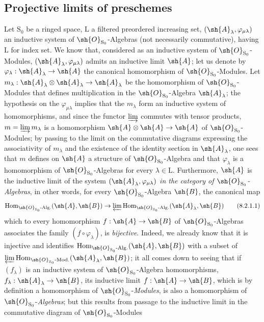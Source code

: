 \subsection{Projective limits of preschemes}
\label{subsection:IV.8.2}

\begin{env}[8.2.1]
\label{IV.8.2.1}
Let $\mathrm{S}_0$ be a ringed space, $\mathrm{L}$ a filtered preordered increasing set, $(\sh{A}_\lambda,\varphi_{\mu\lambda})$ an inductive system of $\sh{O}_{\mathrm{S}_0}$-Algebras (not necessarily commutative), having $\mathrm{L}$ for index set.
We know that, considered as an inductive system of $\sh{O}_{\mathrm{S}_0}$-Modules, $(\sh{A}_\lambda,\varphi_{\mu\lambda})$ admits an inductive limit $\sh{A}$; let us denote by $\varphi_\lambda:\sh{A}_\lambda\to\sh{A}$ the canonical homomorphism of $\sh{O}_{\mathrm{S}_0}$-Modules.
Let $m_\lambda:\sh{A}_\lambda\otimes\sh{A}_\lambda\to\sh{A}_\lambda$ be the homomorphism of $\sh{O}_{\mathrm{S}_0}$-Modules that defines multiplication in the $\sh{O}_{\mathrm{S}_0}$-Algebra $\sh{A}_\lambda$; the hypothesis on the $\varphi_{\mu\lambda}$ implies that the $m_\lambda$ form an inductive system of homomorphisms,
and since the functor $\varinjlim$ commutes with tensor products, $m=\varinjlim m_\lambda$ is a homomorphism $\sh{A}\otimes\sh{A}\to\sh{A}$ of $\sh{O}_{\mathrm{S}_0}$-Modules; by passing to the limit on the commutative diagrams expressing the associativity of $m_\lambda$ and the existence of the identity section in $\sh{A}_\lambda$, one sees that $m$ defines on $\sh{A}$ a structure of $\sh{O}_{\mathrm{S}_0}$-Algebra and that $\varphi_\lambda$ is a homomorphism of $\sh{O}_{\mathrm{S}_0}$-Algebras for every $\lambda\in\mathrm{L}$.
Furthermore, $\sh{A}$ is the inductive limit of the system $(\sh{A}_\lambda,\varphi_{\mu\lambda})$ \emph{in the category of $\sh{O}_{\mathrm{S}_0}$-Algebras}, in other words, for every $\sh{O}_{\mathrm{S}_0}$-Algebra $\sh{B}$, the canonical map
\begin{equation}
  \operatorname{Hom}_{\sh{O}_{\mathrm{S}_0}\text{-}\mathrm{Alg.}}(\sh{A},\sh{B})\to\varprojlim\operatorname{Hom}_{\sh{O}_{\mathrm{S}_0}\text{-}\mathrm{Alg.}}(\sh{A}_\lambda,\sh{B})
  \tag{8.2.1.1}
\label{IV.8.2.1.1}
\end{equation}
which to every homomorphism $f:\sh{A}\to\sh{B}$ of $\sh{O}_{\mathrm{S}_0}$-Algebras associates the family $(f\circ\varphi_\lambda)$, is \emph{bijective}.
Indeed, we already know that it is injective and identifies $\operatorname{Hom}_{\sh{O}_{\mathrm{S}_0}\text{-}\mathrm{Alg.}}(\sh{A},\sh{B})$ with a subset of $\varprojlim\operatorname{Hom}_{\sh{O}_{\mathrm{S}_0}\text{-}\mathrm{Mod.}}(\sh{A}_\lambda,\sh{B})$; it all comes down to seeing that if $(f_\lambda)$ is an inductive system of $\sh{O}_{\mathrm{S}_0}$-Algebra homomorphisms, $f_\lambda:\sh{A}_\lambda\to\sh{B}$, its inductive limit $f:\sh{A}\to\sh{B}$, which is by definition a homomorphism of $\sh{O}_{\mathrm{S}_0}$-\emph{Modules}, is also a homomorphism of $\sh{O}_{\mathrm{S}_0}$-\emph{Algebras}; but this results from passage to the inductive limit in the commutative diagram of $\sh{O}_{\mathrm{S}_0}$-Modules

\end{env}
